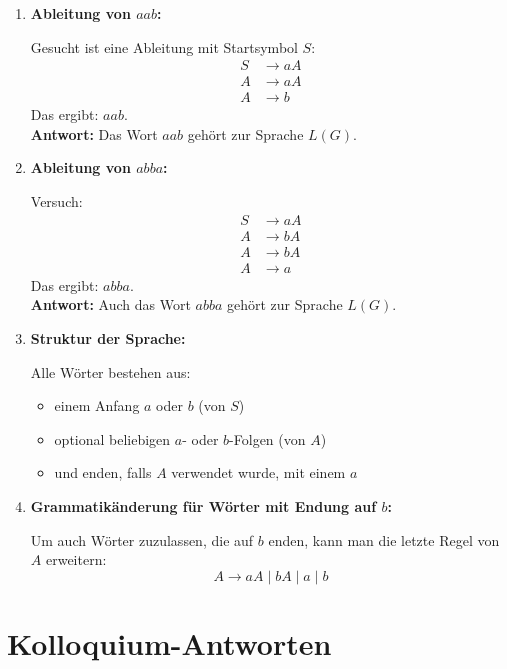 \documentclass[a4paper,12pt]{article}
\begin{document}
\begin{enumerate}
	\item \textbf{Ableitung von \( aab \):}
	
	Gesucht ist eine Ableitung mit Startsymbol \( S \):
	\begin{align*}
		S &\to aA \\
		A &\to aA \\
		A &\to b
	\end{align*}
	Das ergibt: \( aab \). \\
	\textbf{Antwort:} Das Wort \( aab \) gehört zur Sprache \( L(G) \).
	
	\item \textbf{Ableitung von \( abba \):}
	
	Versuch:
	\begin{align*}
		S &\to aA \\
		A &\to bA \\
		A &\to bA \\
		A &\to a
	\end{align*}
	Das ergibt: \( abba \). \\
	\textbf{Antwort:} Auch das Wort \( abba \) gehört zur Sprache \( L(G) \).
	
	\item \textbf{Struktur der Sprache:}
	
	Alle Wörter bestehen aus:
	\begin{itemize}
		\item einem Anfang \( a \) oder \( b \) (von \( S \))
		\item optional beliebigen \( a \)- oder \( b \)-Folgen (von \( A \))
		\item und enden, falls \( A \) verwendet wurde, mit einem \( a \)
	\end{itemize}
	
	\item \textbf{Grammatikänderung für Wörter mit Endung auf \( b \):}
	
	Um auch Wörter zuzulassen, die auf \( b \) enden, kann man die letzte Regel von \( A \) erweitern:
	\[
	A \to aA \mid bA \mid a \mid b
	\]
\end{enumerate}

	
	
	
	
	
	
	
	
	
	\section*{Kolloquium-Antworten}
\end{document}
